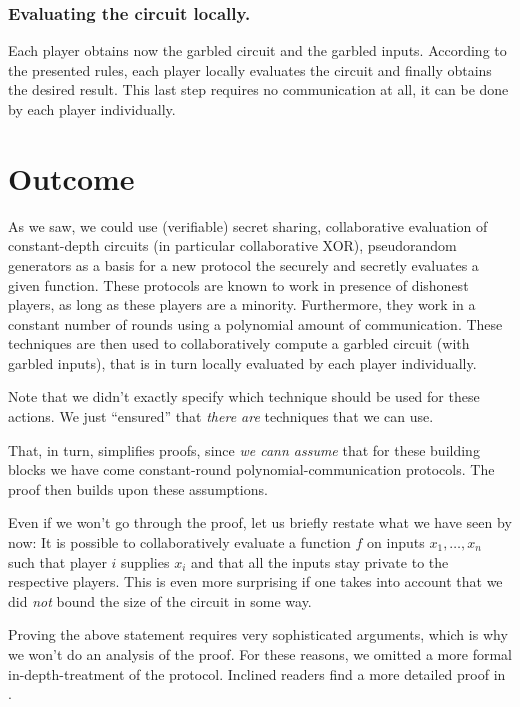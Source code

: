 \message{ !name(seminar.tex)}\documentclass{llncs}
\begin{document}
\subsubsection{Evaluating the circuit locally.}
\label{sec:review-eveluating-circuit}

Each player obtains now the garbled circuit and the garbled inputs. According to the presented rules, each player locally evaluates the circuit and finally obtains the desired result. This last step requires no communication at all, it can be done by each player individually.

\section{Outcome}
\label{sec:correctness-and-security}

As we saw, we could use (verifiable) secret sharing, collaborative evaluation of constant-depth circuits (in particular collaborative XOR), pseudorandom generators as a basis for a new protocol the securely and secretly evaluates a given function. These protocols are known to work in presence of dishonest players, as long as these players are a minority. Furthermore, they work in a constant number of rounds using a polynomial amount of communication. These techniques are then used to collaboratively compute a garbled circuit (with garbled inputs), that is in turn locally evaluated by each player individually.

Note that we didn't exactly specify which technique should be used for these actions. We just ``ensured'' that \emph{there are} techniques that we can use.

That, in turn, simplifies proofs, since \emph{we cann assume} that for these building blocks we have come constant-round polynomial-communication protocols. The proof then builds upon these assumptions.

Even if we won't go through the proof, let us briefly restate what we have seen by now: It is possible to collaboratively evaluate a function $f$ on inputs $x_1,\dots,x_n$ such that player $i$ supplies $x_i$ and that all the inputs stay private to the respective players. This is even more surprising if one takes into account that we did \emph{not} bound the size of the circuit in some way.

Proving the above statement requires very sophisticated arguments, which is why we won't do an analysis of the proof. For these reasons, we omitted a more formal in-depth-treatment of the protocol. Inclined readers find a more detailed proof in \cite{Rogaway:1991:RCS:888502}.
\end{document}
